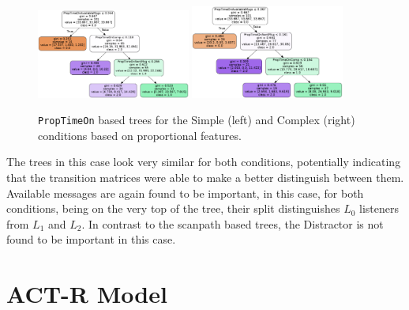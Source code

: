 \begin{figure}
    \centering
    \includegraphics[width=0.45\textwidth]{images/tree_classifier_prop_simple.png}
    \includegraphics[width=0.45\textwidth]{images/tree_classifier_prop_complex.png}
    \caption{\texttt{PropTimeOn} based trees for the Simple (left) and Complex (right) conditions based on proportional features.}
    \label{fig:scanp_trees_prop}
\end{figure}

The trees in this case look very similar for both conditions, potentially indicating that the transition matrices were able to make a better distinguish between them. Available messages are again found to be important, in this case, for both conditions, being on the very top of the tree, their split distinguishes $L_0$ listeners from $L_1$ and $L_2$. In contrast to the scanpath based trees, the Distractor is not found to be important in this case. 


\section{ACT-R Model}
\label{sec:actr_model}
